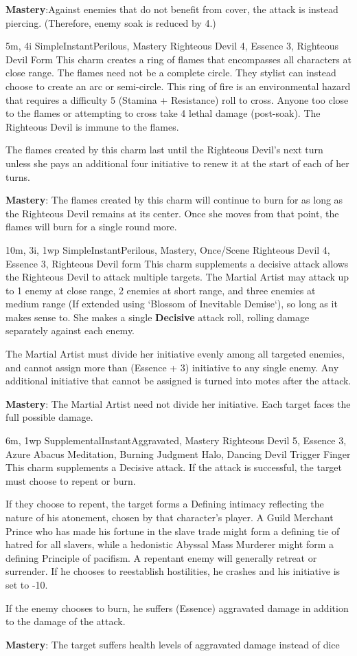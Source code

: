 \textbf{Mastery}:Against enemies that do not benefit from cover, the attack is instead piercing.
(Therefore, enemy soak is reduced by 4.)

{5m, 4i}
{Simple}{Instant}{Perilous, Mastery}
{Righteous Devil 4, Essence 3, Righteous Devil Form}
This charm creates a ring of flames that encompasses all characters at close range.
The flames need not be a complete circle.
They stylist can instead choose to create an arc or semi-circle.
This ring of fire is an environmental hazard that requires a difficulty 5 (Stamina + Resistance) roll to cross.
Anyone too close to the flames or attempting to cross take 4 lethal damage (post-soak).
The Righteous Devil is immune to the flames.

The flames created by this charm last until the Righteous Devil's next turn unless she pays an additional four initiative to renew it at the start of each of her turns.

\textbf{Mastery}: The flames created by this charm will continue to burn for as long as the Righteous Devil remains at its center.
Once she moves from that point, the flames will burn for a single round more.

{10m, 3i, 1wp}
{Simple}{Instant}{Perilous, Mastery, Once/Scene}
{Righteous Devil 4,  Essence 3, Righteous Devil form}
This charm supplements a decisive attack allows the Righteous Devil to attack multiple targets.
The Martial Artist may attack  up to
1 enemy at close range,
2 enemies at short range,
and three enemies at medium range
(If extended using `Blossom of Inevitable Demise`),
so long as it makes sense to.
She makes a single \textbf{Decisive} attack roll,
rolling damage separately against each enemy.

The Martial Artist must divide her initiative evenly among all targeted enemies,
and cannot assign more than (Essence + 3) initiative to any single enemy.
Any additional initiative that cannot be assigned is turned into motes after the attack.

\textbf{Mastery}: The Martial Artist need not divide her initiative.
Each target faces the full possible damage.

{6m, 1wp}
{Supplemental}{Instant}{Aggravated, Mastery}
{Righteous Devil 5, Essence 3, Azure Abacus Meditation, Burning Judgment Halo, Dancing Devil Trigger Finger}
This charm supplements a Decisive attack.
If the attack is successful, the target must choose to repent or burn.

If they choose to repent, the target forms a Defining intimacy reflecting the nature of his atonement,
chosen by that character's player.
A Guild Merchant Prince who has made his fortune in the slave trade might form a defining tie of hatred for all slavers,
while a hedonistic Abyssal Mass Murderer might form a defining Principle of pacifism.
A repentant enemy will generally retreat or surrender.
If he chooses to reestablish hostilities, he crashes and his initiative is set to -10.

If the enemy chooses to burn, he suffers (Essence) aggravated damage in addition to the damage of the attack.

\textbf{Mastery}: The target suffers health levels of aggravated damage instead of dice
